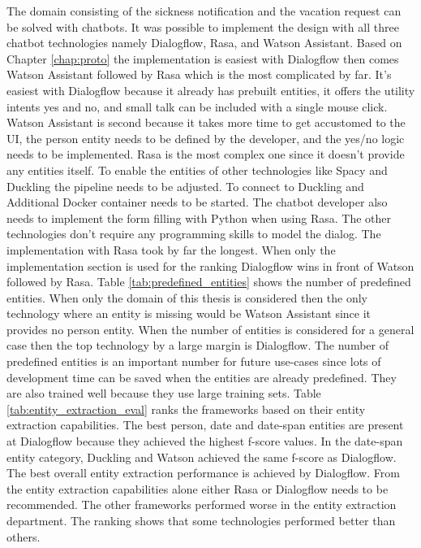 The domain consisting of the sickness notification and the vacation request 
can be solved with chatbots.
It was possible to implement the design with all three chatbot 
technologies namely Dialogflow, Rasa, and Watson Assistant.
Based on Chapter \ref{chap:proto} the implementation is 
easiest with Dialogflow then comes Watson Assistant followed by 
Rasa which is the most complicated by far.
It's easiest with Dialogflow because it already has prebuilt entities,
it offers the utility intents yes and no, and small talk can be 
included with a single mouse click.
Watson Assistant is second because it takes more time to get accustomed 
to the UI, the person entity needs to be defined by the developer,
and the yes/no logic needs to be implemented.
Rasa is the most complex one since it doesn't provide any entities 
itself.
To enable the entities of other technologies like Spacy and Duckling the 
pipeline needs to be adjusted.
To connect to Duckling and Additional Docker container needs to be started.
The chatbot developer also needs to implement the form filling with Python 
when using Rasa. 
The other technologies don't require any programming skills to model the 
dialog.
The implementation with Rasa took by far the longest.
When only the implementation section is used for the ranking 
Dialogflow wins in front of Watson followed by Rasa.
Table \ref{tab:predefined_entities} shows the number of predefined entities.
When only the domain of this thesis is considered then the only technology 
where an entity is missing would be Watson Assistant since it provides no person entity.
When the number of entities is considered for a general case then the 
top technology by a large margin is Dialogflow.
The number of predefined entities is an important number for future use-cases since 
lots of development time can be saved when the entities are already predefined.
They are also trained well because they use large training sets.
Table \ref{tab:entity_extraction_eval} ranks the frameworks based on their 
entity extraction capabilities.
The best person, date and date-span entities are present at Dialogflow because they achieved the 
highest f-score values.
In the date-span entity category, Duckling and Watson achieved the same f-score as Dialogflow.
The best overall entity extraction performance is achieved by Dialogflow. 
From the entity extraction capabilities alone either Rasa or 
Dialogflow needs to be recommended.
The other frameworks performed worse in the entity extraction 
department.
The ranking shows that some technologies performed better than others.
